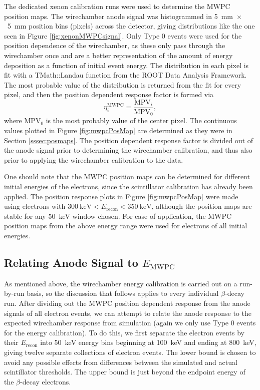 The dedicated xenon calibration runs were used to determine the MWPC position maps.
The wirechamber anode signal was histogrammed in 5~mm~$\times$~5~mm position bins (pixels) across the detector,
giving distributions like the one seen in Figure \ref{fig:xenonMWPCsignal}. Only Type 0 events were used
for the position dependence of the wirechamber, as these only pass through the wirechamber once and are a better
representation of the amount of energy deposition as a function of initial event energy. The distribution
in each pixel is fit with a TMath::Landau function from the ROOT Data Analysis Framework.
The most probable value of
the distribution is returned from the fit for every pixel, and then the position dependent response factor is formed
via
%
\begin{equation}
  \eta^{\mathrm{MWPC}}_i = \frac{\mathrm{MPV}_i}{\mathrm{MPV}_0},
\end{equation}
where $\mathrm{MPV}_0$ is the most probably value of the center pixel.
The continuous values plotted in Figure \ref{fig:mwpcPosMap} are determined as they were in
Section \ref{sssec:posmaps}. The position dependent response factor is divided out of the anode signal
prior to determining the wirechamber calibration, and thus also prior to applying the wirechamber
calibration to the data.

One should note that the MWPC position maps can be determined for different initial energies of the
electrons, since the scintillator calibration has already been applied. The position response plots
in Figure \ref{fig:mwpcPosMap} were made using electrons with $300\mathrm{~keV}<E_{\mathrm{recon}}<350\mathrm{~keV}$,
although the position maps are stable for any 50~keV window chosen. For ease of application, the MWPC position
maps from the above energy range were used for electrons of all initial energies.


\subsection{Relating Anode Signal to $E_{\mathrm{MWPC}}$}

As mentioned above, the wirechamber energy calibration is carried out on a run-by-run basis, so
the discussion that follows applies to every individual $\beta$-decay run.
After dividing out the MWPC position dependent response from the anode signals of all electron events,
we can attempt to relate the anode response to the expected wirechamber response from simulation (again
we only use Type 0 events for the energy calibration). 
To do this, we first separate the electron events by their $E_{\mathrm{recon}}$ into 50~keV energy bins beginning at 100~keV and ending at
800~keV, giving twelve separate collections of electron events. The lower bound is chosen to avoid any possible
effects from differences between the simulated and actual scintillator thresholds. The upper bound is just beyond
the endpoint energy of the $\beta$-decay electrons.

